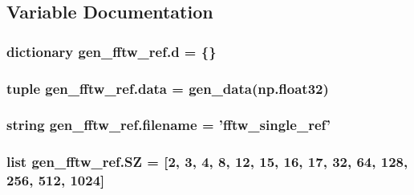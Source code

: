 \subsection{Variable Documentation}
\hypertarget{namespacegen__fftw__ref_afe1a303058ea41eeb1d8a71131cda70b}{}
\subsubsection[{d}]{\setlength{\rightskip}{0pt plus 5cm}dictionary gen\+\_\+fftw\+\_\+ref.\+d = \{\}}\label{namespacegen__fftw__ref_afe1a303058ea41eeb1d8a71131cda70b}
\hypertarget{namespacegen__fftw__ref_ad29c31cc222f1e6e862495ea8a46213e}{}
\subsubsection[{data}]{\setlength{\rightskip}{0pt plus 5cm}tuple gen\+\_\+fftw\+\_\+ref.\+data = {\bf gen\+\_\+data}(np.\+float32)}\label{namespacegen__fftw__ref_ad29c31cc222f1e6e862495ea8a46213e}
\hypertarget{namespacegen__fftw__ref_a44de6539a1fcde88692932a55b333271}{}
\subsubsection[{filename}]{\setlength{\rightskip}{0pt plus 5cm}string gen\+\_\+fftw\+\_\+ref.\+filename = 'fftw\+\_\+single\+\_\+ref'}\label{namespacegen__fftw__ref_a44de6539a1fcde88692932a55b333271}
\hypertarget{namespacegen__fftw__ref_a3e64b36f03fe40d64f4bf707edc526be}{}
\subsubsection[{S\+Z}]{\setlength{\rightskip}{0pt plus 5cm}list gen\+\_\+fftw\+\_\+ref.\+S\+Z = \mbox{[}2, 3, 4, 8, 12, 15, 16, 17, 32, 64, 128, 256, 512, 1024\mbox{]}}\label{namespacegen__fftw__ref_a3e64b36f03fe40d64f4bf707edc526be}
